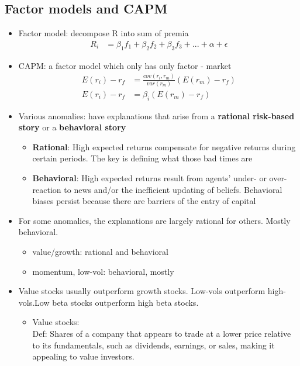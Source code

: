 \documentclass{maths}
\begin{document}
\subsection{Factor models and CAPM}
\begin{itemize}
\item Factor model: decompose R into sum of premia\\
\begin{align*}
R_i &= \beta_1 f_1+\beta_2 f_2+\beta_3 f_3+...+\alpha+\epsilon
\end{align*}

\item CAPM: a factor model which only has only factor - market
\begin{align*}
E(r_i)-r_f &=\frac{cov(r_i,r_m)}{var(r_m)}(E(r_m)-r_f)\\
E(r_i)-r_f &=\beta_i(E(r_m)-r_f)
\end{align*}

\item Various anomalies: have explanations that arise from a \textbf{rational risk-based story} or a \textbf{behavioral story} 
\begin{itemize}
\item \textbf{Rational}: High expected returns compensate for negative returns during certain periods. The key is defining what those bad times are\\
\item \textbf{Behavioral}: High expected returns result from agents' under- or over-reaction to news and/or the inefficient updating of beliefs. Behavioral biases persist because there are barriers of the entry of capital
\end{itemize}

\item For some anomalies, the explanations are largely rational for others. Mostly behavioral.

\begin{itemize}
\item value/growth: rational and behavioral
\item momentum, low-vol: behavioral, mostly
\end{itemize}

\item Value stocks usually outperform growth stocks. Low-vols outperform high-vols.Low beta stocks outperform high beta stocks.
\begin{itemize}
\item Value stocks: \\
Def: Shares of a company that appears to trade at a lower price relative to its fundamentals, such as dividends, earnings, or sales, making it appealing to value investors.\\


\end{itemize}
\end{itemize}
\end{document}
